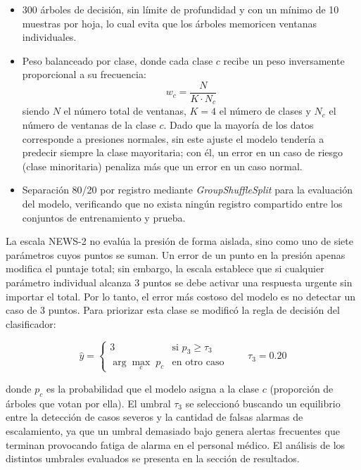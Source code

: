 \documentclass[11pt,a4paper]{article}
\begin{document}
\begin{itemize}
    \item 300 árboles de decisión, sin límite de profundidad y con un mínimo de 10 muestras por hoja, lo cual evita que los árboles memoricen ventanas individuales.
    \item Peso balanceado por clase, donde cada clase $c$ recibe un peso inversamente proporcional a su frecuencia:
    \begin{equation}
        w_c = \frac{N}{K \cdot N_c}
    \end{equation}
    siendo $N$ el número total de ventanas, $K=4$ el número de clases y $N_c$ el número de ventanas de la clase $c$. Dado que la mayoría de los datos corresponde a presiones normales, sin este ajuste el modelo tendería a predecir siempre la clase mayoritaria; con él, un error en un caso de riesgo (clase minoritaria) penaliza más que un error en un caso normal.
    \item Separación 80/20 por registro mediante \textit{GroupShuffleSplit} para la evaluación del modelo, verificando que no exista ningún registro compartido entre los conjuntos de entrenamiento y prueba.
\end{itemize}

La escala NEWS-2 no evalúa la presión de forma aislada, sino como uno de siete parámetros cuyos puntos se suman. Un error de un punto en la presión apenas modifica el puntaje total; sin embargo, la escala establece que si cualquier parámetro individual alcanza 3 puntos se debe activar una respuesta urgente sin importar el total. Por lo tanto, el error más costoso del modelo es no detectar un caso de 3 puntos. Para priorizar esta clase se modificó la regla de decisión del clasificador:

\begin{equation}
    \hat{y} =
    \begin{cases}
        3 & \text{si } p_3 \geq \tau_3 \\
        \arg\max_{c} \; p_c & \text{en otro caso}
    \end{cases}
    \qquad \tau_3 = 0.20
\end{equation}

donde $p_c$ es la probabilidad que el modelo asigna a la clase $c$ (proporción de árboles que votan por ella). El umbral $\tau_3$ se seleccionó buscando un equilibrio entre la detección de casos severos y la cantidad de falsas alarmas de escalamiento, ya que un umbral demasiado bajo genera alertas frecuentes que terminan provocando fatiga de alarma en el personal médico. El análisis de los distintos umbrales evaluados se presenta en la sección de resultados.
\end{document}
